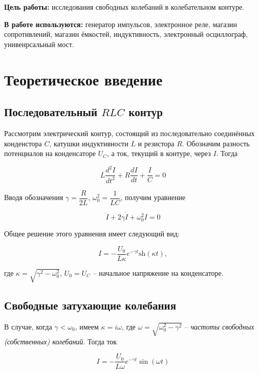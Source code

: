 \textbf{Цель работы:} исследования свободных колебаний в колебательном контуре.

\textbf{В работе используются:} генератор импульсов, электронное реле, магазин сопротивлений, магазин ёмкостей, индуктивность, электронный осциллограф, унивенрсальный мост.

\section{Теоретическое введение}

\subsection{Последовательный $RLC$ контур}

Рассмотрим электрический контур, состоящий из последовательно соединённых конденстора $C$, катушки индуктивности $L$ и резистора $R$. Обозначим разность потенциалов на конденсаторе $U_C$, а ток, текущий в контуре, через $I$. Тогда

\begin{equation}
    L \dfrac{d^2I}{dt^2} + R\dfrac{dI}{dt} + \dfrac{I}{C} = 0
\end{equation}

Вводя обозначения $\gamma = \dfrac{R}{2L}$, $\omega_0^2=\dfrac{1}{LC}$, получим уравнение

\begin{equation}
    \ddot{I} + 2\gamma\dot{I} + \omega_0^2I = 0
\end{equation}

Общее решение этого уравнения имеет следующий вид:

\begin{equation}
    I = -\dfrac{U_0}{L\kappa}e^{-\gamma t}\text{sh}(\kappa t), 
\end{equation}

где $\kappa = \sqrt{\gamma^2 - \omega_0^2}$, $U_0 = U_C$ -- начальное напряжение на конденсаторе.

\subsection{Свободные затухающие колебания}

В случае, когда $\gamma < \omega_0$, имеем $\kappa = i\omega$, где $\omega = \sqrt{\omega_0^2 - \gamma^2}$ -- \textit{частоты свободных (собственных) колебаний}. Тогда ток

\begin{equation}
    I = -\dfrac{U_0}{L\omega}e^{-\gamma t}\sin(\omega t)
\end{equation}

